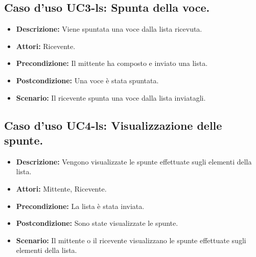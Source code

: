 \subsection{Caso d'uso UC3-ls: Spunta della voce.}
\begin{itemize}
\item[]\textbf{Descrizione:} Viene spuntata una voce dalla lista ricevuta.
\item[]\textbf{Attori:} Ricevente. 
\item[]\textbf{Precondizione:} Il mittente ha composto e inviato una lista. 
\item[]\textbf{Postcondizione:} Una voce è stata spuntata. 
\item[]\textbf{Scenario:}
Il ricevente spunta una voce dalla lista inviatagli. 
\end{itemize}

\subsection{Caso d'uso UC4-ls: Visualizzazione delle spunte.}
\begin{itemize}
\item[]\textbf{Descrizione:} Vengono visualizzate le spunte effettuate sugli elementi della lista.
\item[]\textbf{Attori:} Mittente, Ricevente. 
\item[]\textbf{Precondizione:} La lista è stata inviata. 
\item[]\textbf{Postcondizione:} Sono state visualizzate le spunte. 
\item[]\textbf{Scenario:}
Il mittente o il ricevente visualizzano le spunte effettuate sugli elementi della lista. 
\end{itemize}

\clearpage

